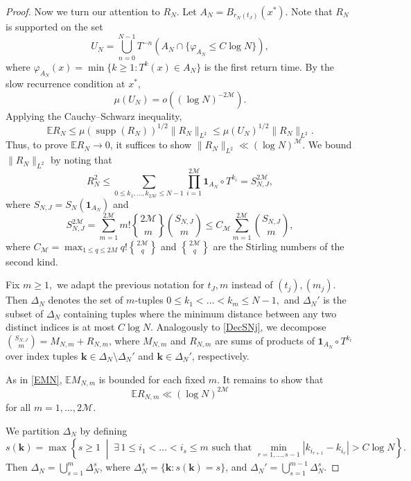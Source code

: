 \documentclass[11pt,twoside,a4paper,reqno]{amsart}
\newcommand{\supp}{\operatorname{supp}}
\newcommand{\E}{\mathbb{E}}
\def\one{{\mathbf{1}}}
\DeclareRobustCommand{\stirling}{\genfrac\{\}{0pt}{}}
\begin{document}
\begin{proof}
Now we turn our attention to $R_N$. Let $A_N = B_{r_N(t_J)}(x^*)$. Note that $R_N$ is supported on the set
$$
U_N = \bigcup_{n=0}^{N-1} T^{-n} \left( A_N \cap \{ \varphi_{A_N} \leq C \log N\} \right),
$$
where $\varphi_{A_N}(x) = \min\{ k \geq 1 : T^k(x) \in A_N \}$ is the first return time. By the slow recurrence condition at $x^*$,
$$
\mu(U_N) = o\left( (\log N)^{-2\mathcal{M}} \right).
$$
Applying the Cauchy--Schwarz inequality,
$$
\E R_N\leq \mu(\supp (R_N))^{1/2} \| R_N \|_{L^2} \leq \mu(U_N)^{1/2} \| R_N \|_{L^2}.
$$
Thus, to prove $\E R_N \rightarrow 0$, it suffices to show $\|R_N\|_{L^2} \ll (\log N)^{\mathcal{M}}$.
We bound $\|R_N\|_{L^2}$ by noting that
$$R_N^2 \leq\sum_{0\leq k_1,\ldots,k_{2\mathcal{M}} \leq N-1} \prod_{i=1}^{2\mathcal{M}} \one_{A_N} \circ T^{k_i}= S_{N,J}^{2\mathcal{M}},$$
where $S_{N,J} = S_N(\one_{A_N})$ and
\begin{equation*}
S_{N,J}^{2\mathcal{M}}= \sum_{m=1}^{2\mathcal{M}}m! \stirling{2\mathcal{M}}{m} {S_{N,J} \choose m} \leq C_{\mathcal{M}} \sum_{m=1}^{2\mathcal{M}} {S_{N,J} \choose m},
\end{equation*}
where $C_{\mathcal{M}}=\max_{1\le q\le2M} q!\stirling{2\mathcal{M}}{q}$ and $\stirling{2\mathcal{M}}{q}$ are the Stirling numbers of the second kind.

Fix $m \geq 1,$ we adapt the previous notation for $t_J,m$ instead of $(t_j),(m_j).$ Then $\Delta_N$ denotes the set of $m$-tuples $0 \leq k_1 < \dots < k_m \leq N-1,$ and $\Delta_N'$ is the subset of $\Delta_N$ containing tuples where the minimum distance between any two distinct indices is at most $C \log N.$ Analogously to \eqref{DecSNj}, we decompose $\binom{S_{N,J}}{m} = M_{N,m} + R_{N,m}$, where $M_{N,m}$ and $R_{N,m}$ are sums of products of $\one_{A_N} \circ T^{k_i}$ over index tuples $\mathbf{k} \in \Delta_N \setminus \Delta_N'$ and $\mathbf{k} \in \Delta_N'$, respectively.


As in \eqref{EMN}, $\mathbb{E}M_{N,m}$ is bounded for each fixed $m$. It remains to show that
$$\mathbb{E}R_{N,m}\ll (\log N)^{2\mathcal{M}}$$
for all $m = 1, \ldots, 2\mathcal{M}$.

We partition $\Delta_N$ by defining
$$s(\mathbf{k}) = \max\left\{ s \geq 1 \;\middle|\; \exists\, 1 \leq i_1 < \dots < i_s \leq m\text{ such that } \min_{r=1,\dots,s-1} |k_{i_{r+1}} - k_{i_r}| > C \log N \right\}.$$
Then $\Delta_N = \bigcup_{s=1}^m \Delta_N^s$, where $\Delta_N^s = \{ \mathbf{k} : s(\mathbf{k}) = s \}$, and $\Delta_N' = \bigcup_{s=1}^{m-1} \Delta_N^s$.


\end{proof}
\end{document}
